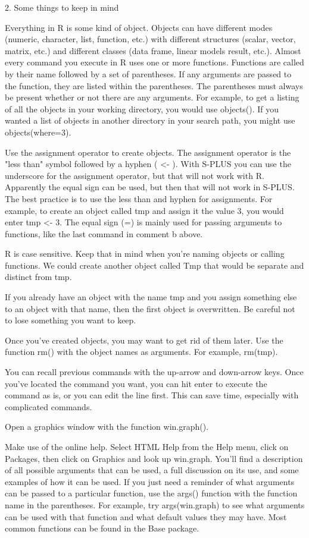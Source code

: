 

2. Some things to keep in mind


Everything in R is some kind of object. Objects can have different modes (numeric, character, list, function, etc.) with different structures (scalar, vector, matrix, etc.) and different classes (data frame, linear models result, etc.). 
Almost every command you execute in R uses one or more functions. Functions are called by their name followed by a set of parentheses. If any arguments are passed to the function, they are listed within the parentheses. The parentheses must always be present whether or not there are any arguments. For example, to get a listing of all the objects in your working directory, you would use objects(). If you wanted a list of objects in another directory in your search path, you might use objects(where=3). 

Use the assignment operator to create objects. The assignment operator is the "less than" symbol followed by a hyphen ( <- ). With S-PLUS you can use the underscore for the assignment operator, but that will not work with R. Apparently the equal sign can be used, but then that will not work in S-PLUS. The best practice is to use the less than and hyphen for assignments. For example, to create an object called tmp and assign it the value 3, you would enter tmp <- 3. The equal sign (=) is mainly used for passing arguments to functions, like the last command in comment b above. 

R is case sensitive. Keep that in mind when you're naming objects or calling functions. We could create another object called Tmp that would be separate and distinct from tmp. 

If you already have an object with the name tmp and you assign something else to an object with that name, then the first object is overwritten. Be careful not to lose something you want to keep. 

Once you've created objects, you may want to get rid of them later. Use the function rm() with the object names as arguments. For example, rm(tmp). 

You can recall previous commands with the up-arrow and down-arrow keys. Once you've located the command you want, you can hit enter to execute the command as is, or you can edit the line first. This can save time, especially with complicated commands. 

Open a graphics window with the function win.graph(). 

Make use of the online help. Select HTML Help from the Help menu, click on Packages, then click on Graphics and look up win.graph. You'll find a description of all possible arguments that can be used, a full discussion on its use, and some examples of how it can be used. If you just need a reminder of what arguments can be passed to a particular function, use the args() function with the function name in the parentheses. For example, try args(win.graph) to see what arguments can be used with that function and what default values they may have. Most common functions can be found in the Base package. 


